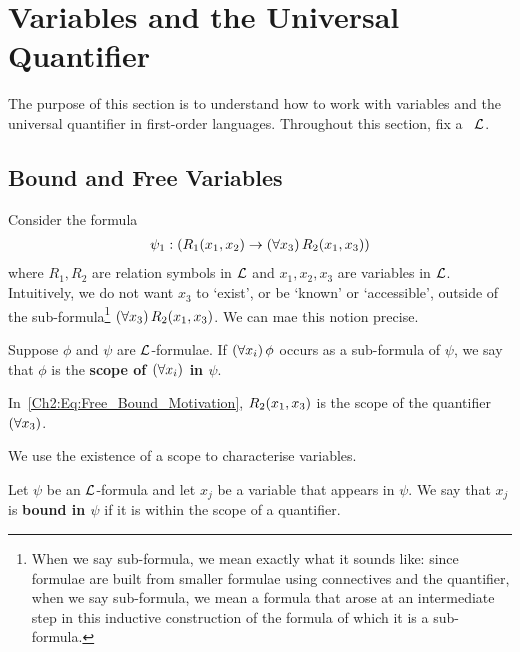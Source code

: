 \section{Variables and the Universal Quantifier}

The purpose of this section is to understand how to work with variables and the universal quantifier in first-order languages. Throughout this section, fix a \fola\ $\mathcal{L}$.

\subsection{Bound and Free Variables}

Consider the formula
\begin{align}
    \psi_1 : \left( R_1\!\left( x_1, x_2 \right) \to \left( \forall x_3 \right)R_2\!\left( x_1, x_3 \right) \right)
    \label{Ch2:Eq:Free_Bound_Motivation}
\end{align}
where $R_1, R_2$ are relation symbols in $\mathcal{L}$ and $x_1, x_2, x_3$ are variables in $\mathcal{L}$. Intuitively, we do not want $x_3$ to `exist', or be `known' or `accessible', outside of the sub-formula\footnote{When we say sub-formula, we mean exactly what it sounds like: since formulae are built from smaller formulae using connectives and the quantifier, when we say sub-formula, we mean a formula that arose at an intermediate step in this inductive construction of the formula of which it is a sub-formula.} $\left( \forall x_3 \right)R_2\!\left( x_1, x_3 \right)$. We can mae this notion precise.

\begin{boxdefinition}
    Suppose $\phi$ and $\psi$ are $\mathcal{L}$-formulae. If $\left( \forall x_i \right)\phi$ occurs as a sub-formula of $\psi$, we say that $\phi$ is the  \textbf{scope of $\left( \forall x_i \right)$ in $\psi$}.
\end{boxdefinition}
\begin{boxexample}
    In~\eqref{Ch2:Eq:Free_Bound_Motivation}, $R_2\!\left( x_1, x_3 \right)$ is the scope of the quantifier $\left( \forall x_3 \right)$.
\end{boxexample}

We use the existence of a scope to characterise variables.

\begin{boxdefinition}
    Let $\psi$ be an $\mathcal{L}$-formula and let $x_j$ be a variable that appears in $\psi$. We say that $x_j$ is \textbf{bound in $\psi$} if it is within the scope of a quantifier.
\end{boxdefinition}

